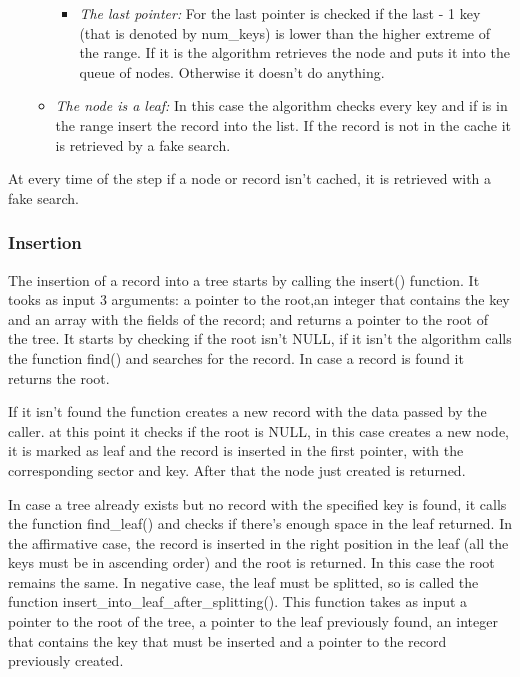 \begin{itemize}
\begin{itemize}
\begin{itemize}
            \item \emph{The last pointer:} For the last pointer is checked if the last - 1 key (that is denoted by num\_keys) is lower than the higher extreme of the range. If it is the algorithm retrieves the node and puts it into the queue of nodes. Otherwise it doesn't do anything.
        \end{itemize}
        \item \emph{The node is a leaf:} In this case the algorithm checks every key and if is in the range insert the record into the list. If the record is not in the cache it is retrieved by a fake search.
    \end{itemize}

\end{itemize}
At every time of the step if a node or record isn't cached, it is retrieved with a fake search.

\subsubsection{Insertion}
The insertion of a record into a tree starts by calling the insert() function. It tooks as input 3 arguments: a pointer to the root,an integer that contains the key and an array with the fields of the record; and returns a pointer to the root of the tree. 
It starts by checking if the root isn't NULL, if it isn't the algorithm calls the function find() and searches for the record. In case a record is found it returns the root.

If it isn't found the function creates a new record with the data passed by the caller. at this point it checks if the root is NULL, in this case creates a new node, it is marked as leaf and the record is inserted in the first pointer, with the corresponding sector and key. After that the node just created is returned.

In case a tree already exists but no record with the specified key is found, it calls the function find\_leaf() and checks if there's enough space in the leaf returned. In the affirmative case, the record is inserted in the right position in the leaf (all the keys must be in ascending order) and the root is returned. In this case the root remains the same. In negative case, the leaf must be splitted, so is called the function insert\_into\_leaf\_after\_splitting(). This function takes as input a pointer to the root of the tree, a pointer to the leaf previously found, an integer that contains the key that must be inserted and a pointer to the record previously created.

